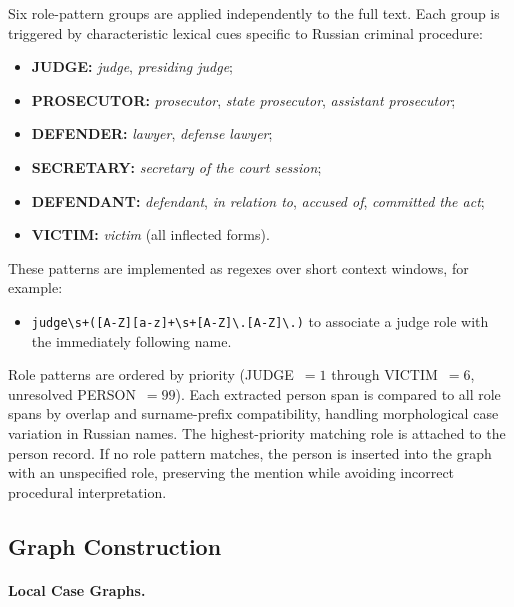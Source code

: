 \documentclass[11pt]{article}
\begin{document}
Six role-pattern groups are applied independently to the full text. Each group is triggered by characteristic lexical cues specific to Russian criminal procedure:
\begin{itemize}
\item \textbf{JUDGE:} \textit{judge}, \textit{presiding judge};
\item \textbf{PROSECUTOR:} \textit{prosecutor}, \textit{state prosecutor}, \textit{assistant prosecutor};
\item \textbf{DEFENDER:} \textit{lawyer}, \textit{defense lawyer};
\item \textbf{SECRETARY:} \textit{secretary of the court session};
\item \textbf{DEFENDANT:} \textit{defendant}, \textit{in relation to}, \textit{accused of}, \textit{committed the act};
\item \textbf{VICTIM:} \textit{victim} (all inflected forms).
\end{itemize}

These patterns are implemented as regexes over short context windows, for example:
\begin{itemize}
\item \verb|judge\s+([A-Z][a-z]+\s+[A-Z]\.[A-Z]\.)| to associate a judge role with the immediately following name.
\end{itemize}

Role patterns are ordered by priority (JUDGE~$=1$ through VICTIM~$=6$, unresolved PERSON~$=99$). Each extracted person span is compared to all role spans by overlap and surname-prefix compatibility, handling morphological case variation in Russian names. The highest-priority matching role is attached to the person record. If no role pattern matches, the person is inserted into the graph with an unspecified role, preserving the mention while avoiding incorrect procedural interpretation.

\subsection{Graph Construction}

\paragraph{Local Case Graphs.}
\end{document}
